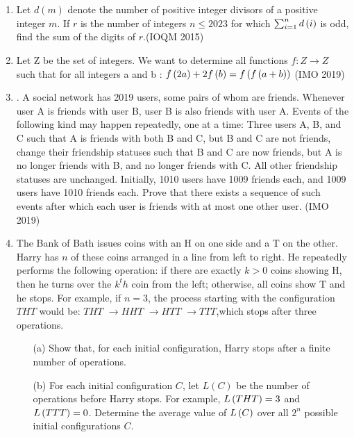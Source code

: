 \begin{enumerate}
    \item Let $d(m)$ denote the number of positive integer divisors of a positive integer $m$. If $r$ is the number of integers $n \leq 2023$ for which
$
		\sum_{i=1}^{n} d \left(i\right)
$
    is odd, find the sum of the digits of $r$.\hfill(IOQM 2015)
    \item Let Z be the set of integers. We want to determine all functions $ f : Z \to Z $ such that for all integers a  and  b :
$
f \left(2a\right) + 2f\left(b\right) = f\left(f\left( a + b\right)\right)
$
\hfill(IMO 2019)
\item. A social network has 2019 users, some pairs of whom are friends. Whenever user A is friends with user B, user B is also friends with user A. Events of the following kind may happen repeatedly, one at a time:
Three users A, B, and C such that A is friends with both B and C, but B and C are not friends, change their friendship statuses such that B and C are now friends, but A is no longer friends with B, and no longer friends with C. All other friendship statuses are unchanged.
Initially, 1010 users have 1009 friends each, and 1009 users have 1010 friends each. Prove that there exists a sequence of such events after which each user is friends with at most one other user.
\hfill(IMO 2019)
\item The Bank of Bath issues coins with an H on one side and a T on the other. Harry has  $n$ of these coins arranged in a line from left to right. He repeatedly performs the following operation: if there are exactly $k > 0$ coins showing H, then he turns over the $ k^th$ coin from the left; otherwise, all coins show T and he stops. For example, if $n = 3$, the process starting with the configuration $THT$ would be: $THT$ $\rightarrow HHT $ $\rightarrow HTT$ $\rightarrow TTT$,which stops after three operations.

\begin{enumerate}
    \item[(a)] Show that, for each initial configuration, Harry stops after a finite number of operations.
    
    \item[(b)] For each initial configuration  $C $, let $L(C)$ be the number of operations before Harry stops. For example, $L\left(THT\right) = 3$ and $L\left( TTT \right) = 0$. Determine the average value of $L\left(C\right)$ over all $2^n$ possible initial configurations $C$.
    

\end{enumerate}
\end{enumerate}
